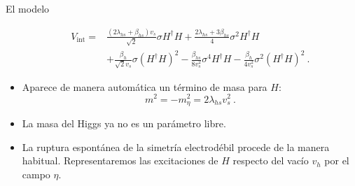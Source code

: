 \documentclass{beamer}
\begin{document}
\begin{frame}{El modelo}
\begin{itemize}
\begin{subequations}
\begin{align}
V_\mathrm{int} =& \frac{(2\lambda_{hs} + \beta_{hs})v_s}{\sqrt{2}}\sigma H^\dagger H + \frac{2\lambda_{hs} + 3\beta_{hs}}{4}\sigma^2 H^\dagger H\nonumber\\ &+ \frac{\beta_h}{\sqrt{2} v_s}\sigma (H^\dagger H)^2 - \frac{\beta_{hs}}{8 v_s^2}\sigma^4 H^\dagger H- \frac{\beta_h}{4 v_s^2}\sigma^2 (H^\dagger H)^2\ . \label{eq:interlagr}
\end{align}
\end{subequations}
\item<only@5> Aparece de manera automática un término de masa para $H$:
\begin{equation}
m^2 = -m_\eta^2 = 2 \lambda_{hs} v_s^2\ .
\end{equation}
\item<only@5> La masa del Higgs ya no es un parámetro libre.
\item<only@5> La ruptura espontánea de la simetría electrodébil procede de la manera habitual. Representaremos las excitaciones de $H$ respecto del vacío $v_h$ por el campo $\eta$.	 

\end{itemize}
\end{frame}
\end{document}
